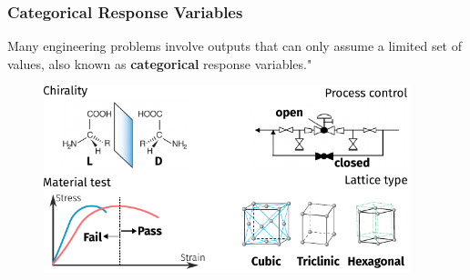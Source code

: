 \documentclass[10pt,aspectratio=169]{beamer}
\begin{document}
\begin{frame}
  \frametitle{Categorical Response Variables}

  Many engineering problems involve outputs that can only assume a limited set of values, also known as \textbf{categorical} response variables."

  \begin{figure}
    \includegraphics[width=0.95\textwidth]{images/categorical.pdf}
  \end{figure}

\end{frame}
\end{document}
